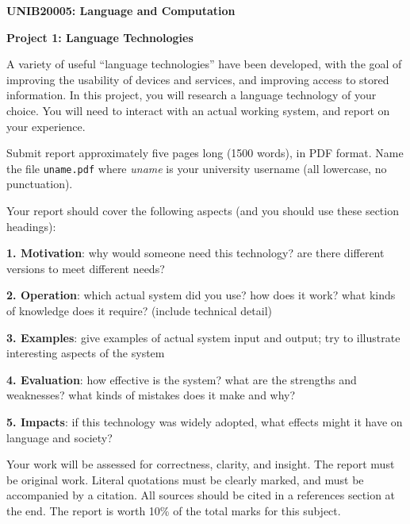 \documentclass[a4paper,10pt]{article}
\begin{document}
\centerline{\LARGE\bf UNIB20005: Language and Computation}\vspace{2ex}

\centerline{\large\bf Project 1: Language Technologies}\vspace{2ex}
\vfil

A variety of useful ``language technologies'' have been developed, with the
goal of improving the usability of devices and services, and improving access
to stored information.  In this project, you will research a language
technology of your choice.  You will need to interact with an actual working
system, and report on your experience.

Submit report approximately five pages long (1500 words), in PDF format.
Name the file \texttt{uname.pdf} where \textit{uname} is your university
username (all lowercase, no punctuation).

Your report should cover the following aspects (and you should use these
section headings):
\begin{description}\setlength{\itemsep}{0pt}\setlength{\parskip}{0pt}
\item \textbf{1. Motivation}: why would someone need this technology?  are there
different versions to meet different needs?
\item \textbf{2. Operation}: which actual system did you use?
how does it work?  what kinds of knowledge
does it require?  (include technical detail)
\item \textbf{3. Examples}: give examples of actual system input and output;
try to illustrate interesting aspects of the system
\item \textbf{4. Evaluation}: how effective is the system? what are the strengths
and weaknesses? what kinds of mistakes does it make and why?
\item \textbf{5. Impacts}: if this technology was widely adopted, what effects
might it have on language and society?
\end{description}

Your work will be assessed for correctness, clarity, and insight.
The report must be original work.  Literal quotations must be clearly
marked, and must be accompanied by a citation.
All sources should be cited in a references section at the end.
The report is worth 10\% of the total marks
for this subject.
\end{document}

